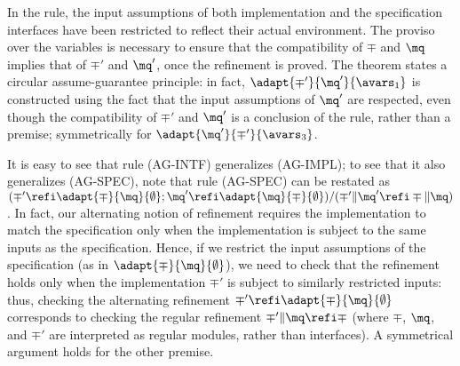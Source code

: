 \noindent
In the rule, the input assumptions of both implementation and the
specification interfaces have been restricted to reflect their actual
environment. 
The proviso over the variables is necessary to ensure that the
compatibility of $\mp$ and $\mq$ implies that of $\mp'$ and $\mq'$,
once the refinement is proved. 
The theorem states a circular assume-guarantee principle: in fact,
$\adapt{\mp'}{\mq'}{\avars_1}$ is constructed using the fact that the
input assumptions of $\mq'$ are respected, even though the
compatibility of $\mp'$ and $\mq'$ is a conclusion of the rule, rather
than a premise; symmetrically for $\adapt{\mq'}{\mp'}{\avars_3}$.


It is easy to see that rule (AG-INTF) generalizes (AG-IMPL); to see
that it also generalizes (AG-SPEC), 
note that rule (AG-SPEC) can be restated as 
$(\mp' \refi \adapt{\mp}{\mq}{\emptyset}; 
  \mq' \refi \adapt{\mq}{\mp}{\emptyset})/
 (\mp' \| \mq' \refi \mp \| \mq)$.
In fact, our alternating notion of refinement requires the
implementation to match the specification only when the implementation
is subject to the same inputs as the specification. 
Hence, if we restrict the input assumptions of the specification (as
in $\adapt{\mp}{\mq}{\emptyset}$), we need to check that the
refinement holds only when the implementation $\mp'$ is subject to
similarly restricted inputs: thus, checking the alternating refinement  
$\mp' \refi \adapt{\mp}{\mq}{\emptyset}$ corresponds to checking the
regular refinement $\mp' \| \mq \refi \mp$ (where $\mp$, $\mq$, and
$\mp'$ are interpreted as regular modules, rather than interfaces). 
A symmetrical argument holds for the other premise. 





